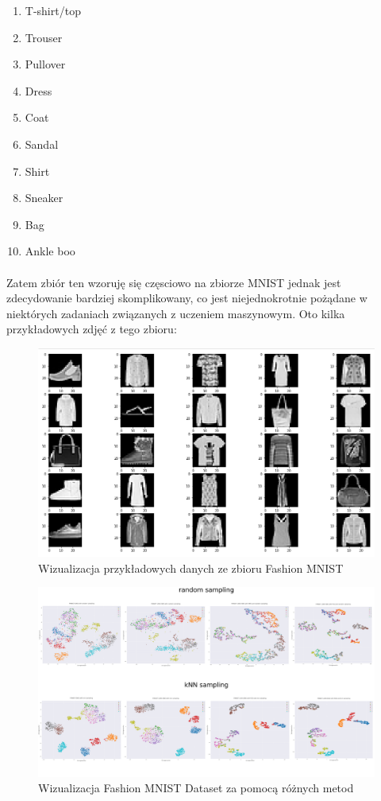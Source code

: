 \documentclass{article}
\begin{document}
\begin{itemize}
    \begin{enumerate}
        \item T-shirt/top
        \item	Trouser
        \item	Pullover
        \item	Dress
        \item	Coat
        \item	Sandal
        \item	Shirt
        \item	Sneaker
        \item	Bag
        \item	Ankle boo
    \end{enumerate}
    \paragraph{}
    Zatem zbiór ten wzoruję się częsciowo na zbiorze MNIST jednak jest zdecydowanie bardziej skomplikowany, co jest niejednokrotnie pożądane w niektórych zadaniach związanych z uczeniem maszynowym. Oto kilka przykładowych zdjęć z tego zbioru:
    
\begin{figure}[h]
\begin{center}
\includegraphics[scale=0.45]{fmnist-visualisation.PNG}
\caption{Wizualizacja przykładowych danych ze zbioru Fashion MNIST}
\end{center}
\end{figure}

    
\begin{figure}[h]
\includegraphics[scale=0.25]{fmnist-dataset-results.png}
\caption{Wizualizacja Fashion MNIST Dataset za pomocą różnych metod}
\end{figure}


\end{itemize}
\end{document}
